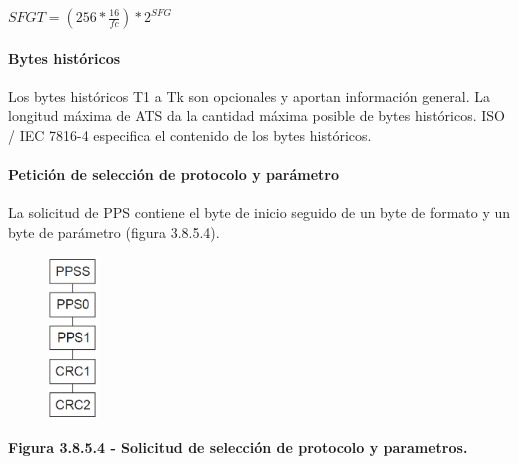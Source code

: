 \begin{center}
 \( SFGT= \left( 256\ast\frac{16}{fc} \right) \ast2^{SFG} \) 
\end{center}
\par

\paragraph{Bytes históricos}
Los bytes históricos T1 a Tk son opcionales y aportan información general. La longitud máxima de ATS da la cantidad máxima posible de bytes históricos. ISO / IEC 7816-4 especifica el contenido de los bytes históricos.\par

\paragraph{Petición de selección de protocolo y parámetro}
La solicitud de PPS contiene el byte de inicio seguido de un byte de formato y un byte de parámetro (figura 3.8.5.4).\par


\vspace{\baselineskip}



\begin{figure}[H]
	\begin{center}
		\includegraphics[width=0.53in,height=1.7in]{Norma_ISO/14443-4/media/image7.png}
    \end{center}
\end{figure}



\par
\begin{center}
\textbf{Figura 3.8.5.4 - Solicitud de selección de protocolo y parametros.}
\end{center}
\par

